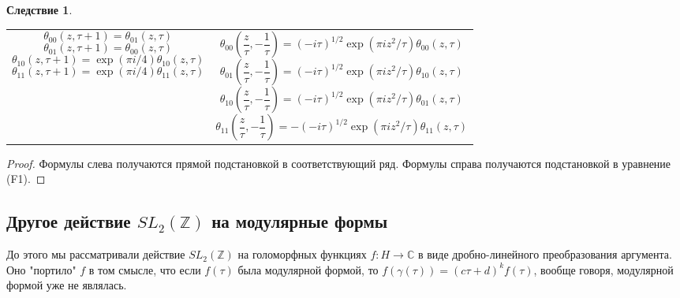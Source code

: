 \documentclass{article}
\newcommand{\ZZ}{\mathbb{Z}}
\newcommand{\CC}{\mathbb{C}}
\theoremstyle{break}
\newtheorem{corollary}{Следствие}[section] %
\begin{document}
\begin{corollary}
	\begin{tabularx}{\textwidth}{@{}X|X@{}}
		\begin{equation}\theta_{00}(z, \tau + 1) = \theta_{01}(z, \tau)\end{equation}
		\begin{equation}\theta_{01}(z, \tau + 1) = \theta_{00}(z, \tau)\end{equation}
		\begin{equation}\theta_{10}(z, \tau + 1) = \exp(\pi i/4)\theta_{10}(z, \tau)\end{equation}
		\begin{equation}\theta_{11}(z, \tau + 1) = \exp(\pi i/4)\theta_{11}(z, \tau)\end{equation}
		&
		\begin{equation}\theta_{00}(\frac{z}{\tau}, -\frac{1}{\tau})
			=(-i\tau)^{1/2}\exp(\pi i z^2 / \tau) \theta_{00}(z, \tau)\end{equation}
		\begin{equation}\theta_{01}(\frac{z}{\tau}, -\frac{1}{\tau})
			=(-i\tau)^{1/2}\exp(\pi i z^2 / \tau) \theta_{10}(z, \tau)\end{equation}
		\begin{equation}\theta_{10}(\frac{z}{\tau}, -\frac{1}{\tau})
			=(-i\tau)^{1/2}\exp(\pi i z^2 / \tau) \theta_{01}(z, \tau)\end{equation}
		\begin{equation}\theta_{11}(\frac{z}{\tau}, -\frac{1}{\tau})
			=-(-i\tau)^{1/2}\exp(\pi i z^2 / \tau) \theta_{11}(z, \tau)\end{equation}
	\end{tabularx}
\end{corollary}
\begin{proof}
	Формулы слева получаются прямой подстановкой в соответствующий ряд. Формулы справа получаются подстановкой в уравнение (F1).
\end{proof}

\subsection{Другое действие $SL_2(\ZZ)$ на модулярные формы}
До этого мы рассматривали действие $SL_2(\ZZ)$ на голоморфных функциях $f: H \to \CC$
 в виде дробно-линейного преобразования аргумента. Оно "портило" $f$ в том смысле, что если $f(\tau)$ была модулярной формой, то 
 $f(\gamma(\tau)) = (c\tau + d)^kf(\tau)$, вообще говоря,
  модулярной формой уже не являлась.
 
\end{document}
